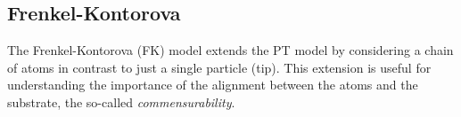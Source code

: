 








\subsection{Frenkel-Kontorova}

The Frenkel-Kontorova (\acrshort{FK}) model \cite{Frenkel_1938} extends the \acrshort{PT} model by considering a chain of atoms in contrast to just a single particle (tip). This extension is useful for understanding the importance of the alignment between the atoms and the substrate, the so-called \textit{commensurability}.

